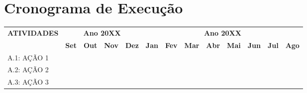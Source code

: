 \section{Cronograma de Execução}

\newcommand{\anoA}{20XX}
\newcommand{\anoB}{20XX}
\newcommand{\mesI}{Set}
\newcommand{\mesII}{Out}
\newcommand{\mesIII}{Nov}
\newcommand{\mesIV}{Dez}
\newcommand{\mesV}{Jan}
\newcommand{\mesVI}{Fev}
\newcommand{\mesVII}{Mar}
\newcommand{\mesVIII}{Abr}
\newcommand{\mesIX}{Mai}
\newcommand{\mesX}{Jun}
\newcommand{\mesXI}{Jul}
\newcommand{\mesXII}{Ago}
\newcommand{\feito}{\checkmark}

\renewcommand{\arraystretch}{1.2} %
\begin{table}[H]
    \centering
    \begin{tabular}{|p{3.6cm}|c|c|c|c|c|c|c|c|c|c|c|c|}
        \hline
        \multirow{2}{*}{\textbf{ATIVIDADES}} & \multicolumn{4}{c|}{\textbf{Ano \anoA}} & \multicolumn{8}{c|}{\textbf{Ano \anoB}}                                                                                                                                                                                        \\
        \cline{2-13}
                                             & \textbf{\mesI}                          & \textbf{\mesII}                         & \textbf{\mesIII} & \textbf{\mesIV} & \textbf{\mesV} & \textbf{\mesVI} & \textbf{\mesVII} & \textbf{\mesVIII} & \textbf{\mesIX} & \textbf{\mesX} & \textbf{\mesXI} & \textbf{\mesXII} \\
        \hline
        A.1: AÇÃO 1                          & \feito                                  & \feito                                  &                  &                 &                &                 &                  &                   &                 &                &                 &                  \\
        \hline
        A.2: AÇÃO 2                          &                                         & \feito                                  & \feito           & \feito          &                &                 &                  &                   &                 &                &                 &                  \\
        \hline
        A.3: AÇÃO 3                          &                                         &                                         & \feito           & \feito          & \feito         &                 &                  &                   &                 &                &                 &                  \\

\end{tabular}
\end{table}
